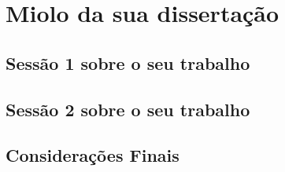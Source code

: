 \chapter{Miolo da sua dissertação}\label{cap:miolo}


\section{Sessão 1 sobre o seu trabalho}

\section{Sessão 2 sobre o seu trabalho}

\section{Considerações Finais}
